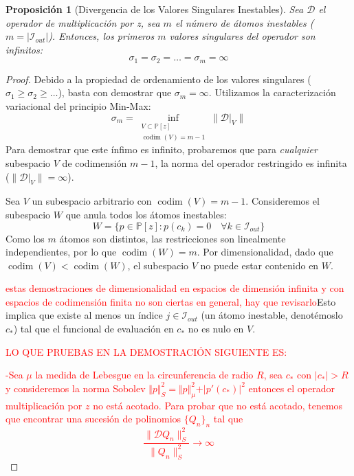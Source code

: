\documentclass[12pt,a4paper]{article}
\newtheorem{proposicion}{Proposición}
\newcommand{\Poly}{\mathbb{P}[z]}
\begin{document}
\begin{proposicion}[Divergencia de los Valores Singulares Inestables]
Sea $\mathcal{D}$ el operador de multiplicación por z, sea $m$ el número de átomos inestables ($m=|\mathcal{I}_{out}|$).
Entonces, los primeros $m$ valores singulares del operador son infinitos:
\begin{equation}
    \sigma_1 = \sigma_2 = \dots = \sigma_m = \infty
\end{equation}
\end{proposicion}

\begin{proof}
Debido a la propiedad de ordenamiento de los valores singulares ($\sigma_1 \ge \sigma_2 \ge \dots$), basta con demostrar que $\sigma_m = \infty$. Utilizamos la caracterización variacional del principio Min-Max:
$$ \sigma_m = \inf_{\substack{V \subset \Poly \\ \operatorname{codim}(V) = m-1}} \|\mathcal{D}|_V\| $$
Para demostrar que este ínfimo es infinito, probaremos que para \emph{cualquier} subespacio $V$ de codimensión $m-1$, la norma del operador restringido es infinita ($\|\mathcal{D}|_V\| = \infty$).

Sea $V$ un subespacio arbitrario con $\operatorname{codim}(V) = m-1$.
Consideremos el subespacio $W$ que anula todos los átomos inestables:
$$ W = \{ p \in \Poly : p(c_k) = 0 \quad \forall k \in \mathcal{I}_{out} \} $$
Como los $m$ átomos son distintos, las restricciones son linealmente independientes, por lo que $\operatorname{codim}(W) = m$.
Por dimensionalidad, dado que $\operatorname{codim}(V) < \operatorname{codim}(W)$, el subespacio $V$ no puede estar contenido en $W$. 

\textcolor{red}{estas demostraciones de dimensionalidad en espacios de dimensión infinita y con espacios de codimensión finita no son ciertas en general, hay que revisarlo}Esto implica que existe al menos un índice $j \in \mathcal{I}_{out}$ (un átomo inestable, denotémoslo $c_*$) tal que el funcional de evaluación en $c_*$ no es nulo en $V$.


\textcolor{red}{LO QUE PRUEBAS EN LA DEMOSTRACIÓN SIGUIENTE ES:}

\textcolor{red}{-Sea $\mu$ la medida de Lebesgue en la circunferencia de radio $R$, sea $c_{*}$ con $\vert c_{*} \vert >R$ y consideremos la norma Sobolev $\Vert p \Vert^2_{S} = \Vert p \Vert^2_{\mu}+ \vert p'(c_{*})\vert^2$ 
entonces el operador multiplicación por $z$ no está acotado. Para probar que no está acotado, tenemos que encontrar una sucesión de polinomios $\{Q_n\}_{n}$ tal que 
$$ \frac{\|\mathcal{D}Q_n\|_S^2}{\|Q_n\|_S^2} \to \infty
$$} 
 



\end{proof}
\end{document}
